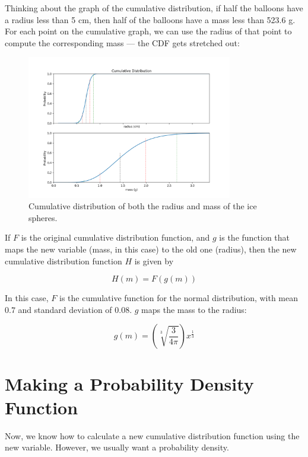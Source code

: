 Thinking about the graph of the cumulative distribution, if half the balloons have a radius less than 5 cm, then half of the balloons have a mass less than 523.6 g. For each point on the cumulative graph, we can use the radius of that point to compute the corresponding mass --- the CDF gets stretched out:
\begin{figure}[htbp]
    \centering
    \includegraphics[width=0.8\textwidth]{cdf_after.png}
    \caption{Cumulative distribution of both the radius and mass of the ice spheres.}
    \label{fig:example}
\end{figure}

If $F$ is the original cumulative distribution function, and $g$ is the function that maps the new variable (mass, in this case) to the old one (radius), then the 
new cumulative distribution function $H$ is given by 

$$H(m) = F(g(m))$$

In this case, $F$ is the cumulative function for the normal distribution, with mean $0.7$ and standard deviation of $0.08$. $g$ maps the mass to the radius:

$$g(m) =\left(\sqrt[3]{\frac{3}{4 \pi}}\right) x^{\frac{1}{3}}$$

\section{Making a Probability Density Function}

Now, we know how to calculate a new cumulative distribution function using the new variable. However, we usually want a probability density.


